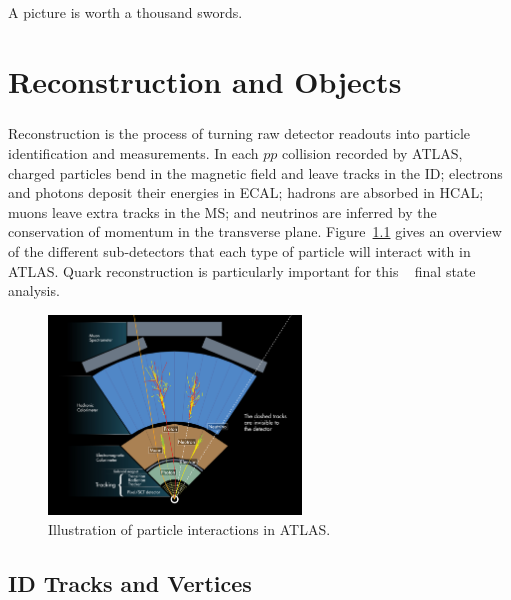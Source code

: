 \begin{savequote}[75mm]
A picture is worth a thousand swords.
\end{savequote}

\chapter{Reconstruction and Objects}

\paragraph{}
Reconstruction is the process of turning raw detector readouts into particle identification and measurements.
In each $pp$ collision recorded by ATLAS, charged particles bend in the magnetic field and leave tracks in the ID; electrons and photons deposit their energies in ECAL; hadrons are absorbed in HCAL; muons leave extra tracks in the MS; and neutrinos are inferred by the conservation of momentum in the transverse plane. 
Figure~\ref{fig:obj_reco_overview} gives an overview of the different sub-detectors that each type of particle will interact with in ATLAS. 
Quark reconstruction is particularly important for this \bbbb~ final state analysis.

\begin{figure}[htbp!]
  \centering
  \captionsetup{justification=centering}
  \includegraphics[width=0.6\textwidth]{figures/detector/ATLAS_particle}
   \caption{Illustration of particle interactions in ATLAS.}
  \label{fig:obj_reco_overview}
\end{figure}

\section{ID Tracks and Vertices}

